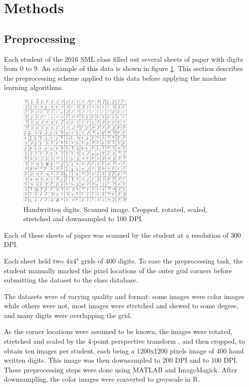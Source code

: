 \section{Methods}
\subsection{Preprocessing}
\label{sec:preprocessing}
Each student of the 2016 SML class filled out several sheets of paper
with digits from 0 to 9. An example of this data
is shown in figure 
\ref{fig:handwriten_digits}. 
This section describes the preprocessing scheme
applied to this data before applying the machine learning algorithms.
\begin{figure}[ht]
\centering
\includegraphics[width = 0.5\textwidth]{img/cropY2016G2M1-100-7.png}
\caption[Handwritten digits]
{
Handwritten digits. Scanned image. Cropped, rotated, scaled, stretched
and downsampled to 100 DPI.
}
\label{fig:handwriten_digits}
\end{figure}
Each of these sheets of paper was scanned by the student at a resolution of 300 DPI.

Each sheet held two 4x4" grids of 400 digits.
To ease the preprocessing task,
the student manually marked the pixel locations of the outer grid corners
before submitting the dataset to the class database.

The datasets were of varying quality and format:
some images were color images while others were not,
most images were stretched and skewed to some degree,
and many digits were overlapping the grid.

As the corner locations were assumed to be known,
the images were rotated, stretched and scaled
by the 4-point perspective transform \citep{perspective},
and then cropped,
to obtain ten images per student,
each being a 1200x1200 pixels image of 400 hand written digits.
This image was then downsampled to 200 DPI and to 100 DPI.
These preprocessing steps were done using MATLAB and ImageMagick.
After downsampling, the color images were converted to greyscale in R.

